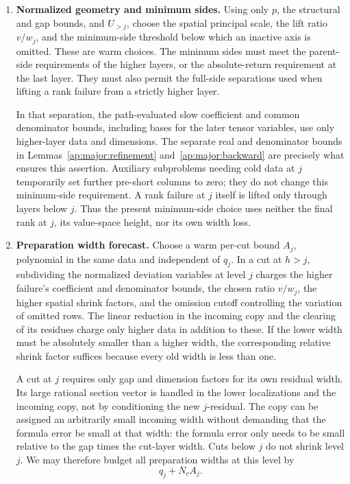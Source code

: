 \begin{enumerate}
\item \textbf{Normalized geometry and minimum sides.}
Using only $p$, the structural and gap bounds, and $U_{>j}$, choose the
spatial principal scale, the lift ratio $v/w_j$, and the minimum-side
threshold below which an inactive axis is omitted.  These are warm
choices.  The minimum sides must meet the parent-side requirements of
the higher layers, or the absolute-return requirement at the last layer.
They must also permit the full-side separations used when lifting a
rank failure from a strictly higher layer.

In that separation, the path-evaluated slow coefficient and common
denominator bounds, including bases for the later tensor variables,
use only higher-layer data and dimensions.  The separate real and
denominator bounds in Lemmas~\ref{ap:major:refinement}
and~\ref{ap:major:backward} are precisely what ensures this assertion.
Auxiliary subproblems needing cold data at $j$ temporarily set further
pre-short columns to zero; they do not change this minimum-side
requirement.  A rank failure at $j$ itself is lifted only through layers
below $j$.  Thus the present minimum-side choice uses neither the final
rank at $j$, its value-space height, nor its own width loss.

\item \textbf{Preparation width forecast.}
Choose a warm per-cut bound $A_j$, polynomial in the same data and
independent of $q_j$.  In a cut at $h>j$, subdividing the normalized
deviation variables at level $j$ charges the higher failure's coefficient
and denominator bounds, the chosen ratio $v/w_j$, the higher spatial
shrink factors, and the omission cutoff controlling the variation of
omitted rows.  The linear reduction in the incoming copy and the
clearing of its residues charge only higher data in addition to these.
If the lower width must be absolutely smaller than a higher width, the
corresponding relative shrink factor suffices because every old width
is less than one.

A cut at $j$ requires only gap and dimension factors for its own residual
width.  Its large rational section vector is handled in the lower
localizations and the incoming copy, not by conditioning the new
$j$-residual.  The copy can be assigned an arbitrarily small incoming
width without demanding that the formula error be small at that width:
the formula error only needs to be small relative to the gap times the
cut-layer width.  Cuts below $j$ do not shrink level $j$.  We may therefore
budget all preparation widths at this level by
\[
                           q_j+N_c A_j.
\]


\end{enumerate}
